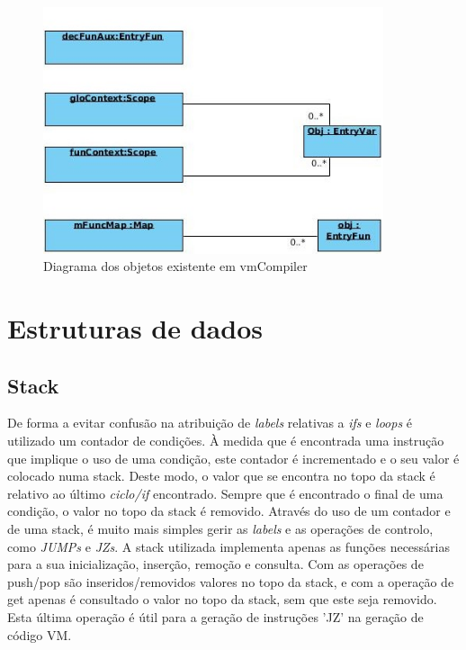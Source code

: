 \documentclass[a4paper,10pt]{report}
\begin{document}
\begin{figure}
\centering
\includegraphics[width=10cm]{imagens/objetos.jpg}
\caption{Diagrama dos objetos existente em vmCompiler}
\label{fig:objs}
\end{figure}



\section{Estruturas de dados}

\subsection{Stack}
      De forma a evitar confusão na atribuição de \emph{labels} relativas a \emph{ifs} e \emph{loops} é utilizado um contador de condições. À medida que é encontrada uma instrução que implique o uso de uma condição, este contador é incrementado e o seu valor é colocado numa stack. Deste modo, o valor que se encontra no topo da stack é relativo ao último \emph{ciclo/if} encontrado. Sempre que é encontrado o final de uma condição, o valor no topo da stack é removido. Através do uso de um contador e de uma stack, é muito mais simples gerir as \emph{labels} e as operações de controlo, como \emph{JUMPs} e \emph{JZs}.
      A stack utilizada implementa apenas as funções necessárias para a sua inicialização, inserção, remoção e consulta. Com as operações de push/pop são inseridos/removidos valores no topo da stack, e com a operação de get apenas é consultado o valor no topo da stack, sem que este seja removido. Esta última operação é útil para a geração de instruções 'JZ' na geração de código VM.
\end{document}
